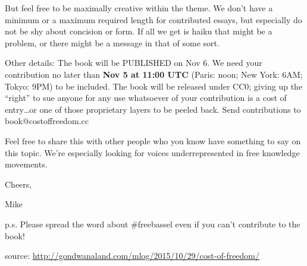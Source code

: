 But feel free to be maximally creative within the theme. We don't have a
minimum or a maximum required length for contributed essays, but
especially do not be shy about concision or form. If all we get is haiku
that might be a problem, or there might be a message in that of some
sort.

Other details: The book will be PUBLISHED on Nov 6. We need your
contribution no later than \textbf{Nov 5 at 11:00 UTC} (Paris: noon; New
York: 6AM; Tokyo: 9PM) to be included. The book will be released under
CC0; giving up the ``right'' to sue anyone for any use whatsoever of
your contribution is a cost of entry\ldots{}or one of those proprietary
layers to be peeled back. Send contributions to book@costoffreedom.cc

Feel free to share this with other people who you know have something to
say on this topic. We're especially looking for voices underrepresented
in free knowledge movements.

Cheers,

Mike

p.s. Please spread the word about \#freebassel even if you can't
contribute to the book!

source: \url{http://gondwanaland.com/mlog/2015/10/29/cost-of-freedom/}
